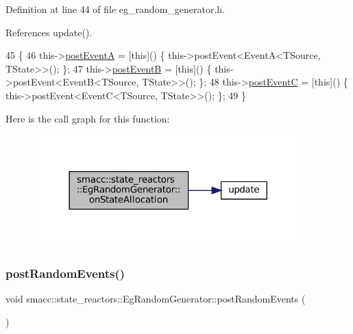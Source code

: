 Definition at line 44 of file eg\+\_\+random\+\_\+generator.\+h.



References update().


\begin{DoxyCode}
45             \{
46                 this->\hyperlink{classsmacc_1_1state__reactors_1_1EgRandomGenerator_ab8052ff063ec83c70bce16e22d93adf6}{postEventA} = [\textcolor{keyword}{this}]() \{ this->postEvent<EventA<TSource, TState>>(); \};
47                 this->\hyperlink{classsmacc_1_1state__reactors_1_1EgRandomGenerator_abece688b6929dfafeeda21a09ec8efd0}{postEventB} = [\textcolor{keyword}{this}]() \{ this->postEvent<EventB<TSource, TState>>(); \};
48                 this->\hyperlink{classsmacc_1_1state__reactors_1_1EgRandomGenerator_acdbf47a22c657f091381c514752940c1}{postEventC} = [\textcolor{keyword}{this}]() \{ this->postEvent<EventC<TSource, TState>>(); \};
49             \}
\end{DoxyCode}
Here is the call graph for this function\+:
\nopagebreak
\begin{figure}[H]
\begin{center}
\leavevmode
\includegraphics[width=296pt]{classsmacc_1_1state__reactors_1_1EgRandomGenerator_ad2e828248d15912cfe27953c8a0ddd51_cgraph}
\end{center}
\end{figure}
\mbox{\label{classsmacc_1_1state__reactors_1_1EgRandomGenerator_ab570c2d1a3e70adb8cfacfcd9000715e}} 
\subsubsection{\texorpdfstring{post\+Random\+Events()}{postRandomEvents()}}
{\footnotesize\ttfamily void smacc\+::state\+\_\+reactors\+::\+Eg\+Random\+Generator\+::post\+Random\+Events (\begin{DoxyParamCaption}{ }\end{DoxyParamCaption})}




